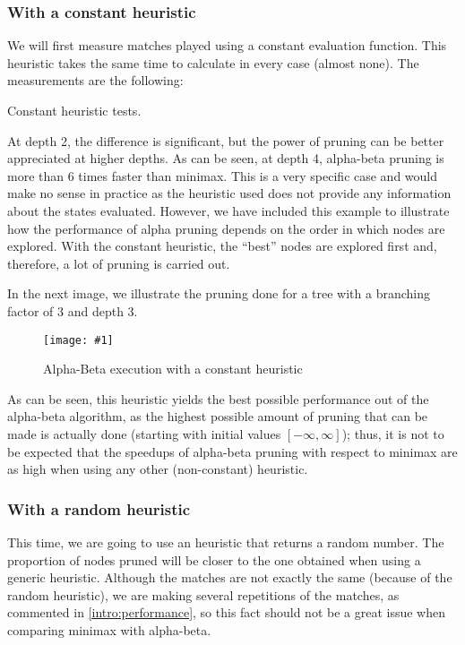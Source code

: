 \documentclass{article}
\newcommand{\myFigure}[4]{%
    \begin{figure}[H]
        \texttt{[image: \#1]}
        \centering
        \caption{#2}
        \label{#3}
    \end{figure}
}
\begin{document}
\subsubsection{With a constant heuristic }\label{table:constant_heuristic}

We will first measure matches played using a constant evaluation function. This heuristic takes the same time to calculate in every case (almost none). The measurements are the following:

\begin{table}[h!]
    \centering
    
    \caption{Constant heuristic tests.}
    \label{table:cte}
\end{table}

At depth 2, the difference is significant, but the power of pruning can be better appreciated at higher depths. As can be seen, at depth 4, alpha-beta pruning is more than 6 times faster than minimax. This is a very specific case and would make no sense in practice as the heuristic used does not provide any information about the states evaluated. However, we have included this example to illustrate how the performance of alpha pruning depends on the order in which nodes are explored. With the constant heuristic, the ``best'' nodes are explored first and, therefore, a lot of pruning is carried out.

In the next image, we illustrate the pruning done for a tree with a branching factor of 3 and depth 3.

\myFigure{./images/constant_b3_d4.png}{Alpha-Beta execution with a constant heuristic}{}{.9}

As can be seen, this heuristic yields the best possible performance out of the alpha-beta algorithm, as the highest possible amount of pruning that can be made is actually done (starting with initial values $[-\infty,\infty]$); thus, it is not to be expected that the speedups of alpha-beta pruning with respect to minimax are as high when using any other (non-constant) heuristic.

\subsubsection{With a random heuristic}\label{table:random_heuristics}

This time, we are going to use an heuristic that returns a random number. The proportion of nodes pruned will be closer to the one obtained when using a generic heuristic. Although the matches are not exactly the same (because of the random heuristic), we are making several repetitions of the matches, as commented in \ref{intro:performance}, so this fact should not be a great issue when comparing minimax with alpha-beta.
\end{document}

